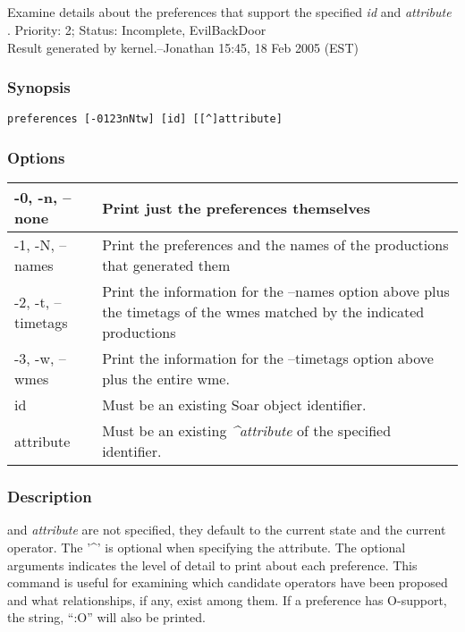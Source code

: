 \subsection{}
\label{preferences}
Examine details about the preferences that support the specified \emph{id}
 and \emph{attribute}
. 
 Priority: 2; Status: Incomplete, EvilBackDoor\\ 
Result generated by kernel.--Jonathan 15:45, 18 Feb 2005 (EST) 
\subsubsection*{Synopsis}
\begin{verbatim}
preferences [-0123nNtw] [id] [[^]attribute]
\end{verbatim}
\subsubsection*{Options}
\begin{tabular}{|l|l|}
\hline 
 -0, -n, --none  & Print just the preferences themselves  \\
 \hline 
 -1, -N, --names  & Print the preferences and the names of the productions that generated them  \\
 \hline 
 -2, -t, --timetags  & Print the information for the --names option above plus the timetags of the wmes matched by the indicated productions  \\
 \hline 
 -3, -w, --wmes  & Print the information for the --timetags option above plus the entire wme.  \\
 \hline 
id & Must be an existing Soar object identifier.  \\
 \hline 
attribute & Must be an existing \emph{\^{}attribute}
 of the specified identifier.  \\
 \hline 
\end{tabular}
\subsubsection*{Description}
 and \emph{attribute}
 are not specified, they default to the current state and the current operator. The '\^{}' is optional when specifying the attribute. The optional arguments indicates the level of detail to print about each preference. 
 This command is useful for examining which candidate operators have been proposed and what relationships, if any, exist among them. If a preference has O-support, the string, ``:O'' will also be printed. 
